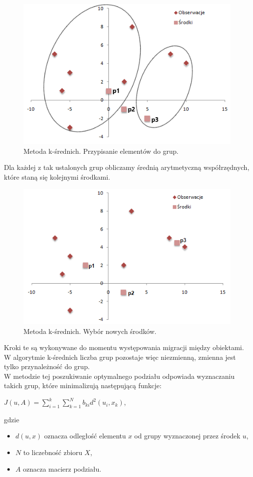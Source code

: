 \documentclass[12pt,a4paper]{report}
\begin{document}
\begin{figure}[H]
\centering
\includegraphics[scale=0.8]{ks_1.png} 
\caption{Metoda k-średnich. Przypisanie elementów do grup.}
\end{figure}
Dla każdej z tak ustalonych grup obliczamy średnią arytmetyczną współrzędnych, które staną się kolejnymi środkami.
\begin{figure}[H]
\centering
\includegraphics[scale=0.8]{ks_2.png} 
\caption{Metoda k-średnich. Wybór nowych środków.}
\end{figure}
Kroki te są wykonywane do momentu występowania migracji między obiektami.
\\W algorytmie k-średnich liczba grup pozostaje więc niezmienną, zmienna jest tylko przynależność do grup.
\\W metodzie tej poszukiwanie optymalnego podziału odpowiada wyznaczaniu takich grup, które minimalizują następującą funkcje:
\begin{center}
$J(u,A) = \sum_{i=1}^k \sum_{k=1}^N b_{ki}d^2(u_i,x_k)$,
\end{center}
gdzie 
\begin{itemize}
\item $d(u,x)$ oznacza odległość elementu $x$ od grupy wyznaczonej przez środek $u$,
\item $N$ to liczebność zbioru $X$,
\item $A$ oznacza macierz podziału.
\end{itemize}
 
\end{document}
